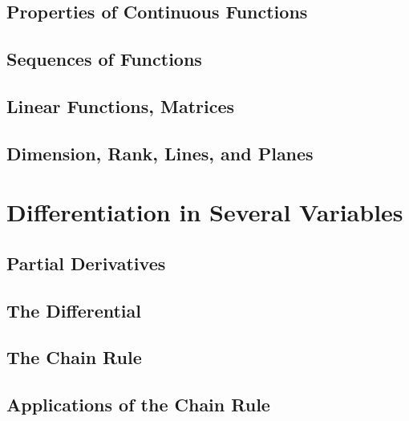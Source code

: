\documentclass[12pt]{book}
\begin{document}
\section{Properties of Continuous Functions}

\section{Sequences of Functions}


\section{Linear Functions, Matrices}


\section{Dimension, Rank, Lines, and Planes}



\chapter{Differentiation in Several Variables}
\section{Partial Derivatives}


\section{The Differential}

\section{The Chain Rule}


\section{Applications of the Chain Rule}
\end{document}
